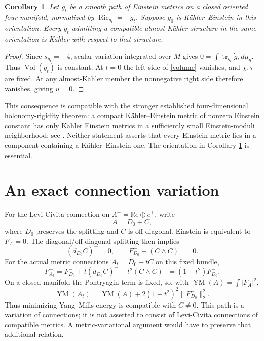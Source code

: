 \documentclass[11pt]{article}
\newtheorem{corollary}[proposition]{Corollary}
\newcommand{\Ric}{\operatorname{Ric}}
\newcommand{\tr}{\operatorname{tr}}
\newcommand{\YM}{\operatorname{YM}}
\newcommand{\vol}{\,d\mu_g}
\begin{document}
\begin{corollary}\label{path}
Let $g_t$ be a smooth path of Einstein metrics on a closed oriented four-manifold, normalized by $\Ric_{g_t}=-g_t$. Suppose $g_0$ is K\"ahler--Einstein in this orientation. Every $g_t$ admitting a compatible almost-K\"ahler structure in the same orientation is K\"ahler with respect to that structure.
\end{corollary}
\begin{proof}
Since $s_{g_t}=-4$, scalar variation integrated over $M$ gives
$0=\int\tr_{g_t}\dot g_t\vol$. Thus $\operatorname{Vol}(g_t)$ is constant. At $t=0$ the left side of \eqref{volume} vanishes, and $\chi,\tau$ are fixed. At any almost-K\"ahler member the nonnegative right side therefore vanishes, giving $u=0$.
\end{proof}
This consequence is compatible with the stronger established four-dimensional holonomy-rigidity theorem: a compact K\"ahler--Einstein metric of nonzero Einstein constant has only K\"ahler Einstein metrics in a sufficiently small Einstein-moduli neighborhood; see \cite[Theorem 6.13]{SS}. Neither statement asserts that every Einstein metric lies in a component containing a K\"ahler--Einstein one. The orientation in Corollary \ref{path} is essential.

\section{An exact connection variation}
For the Levi-Civita connection on $\Lambda^+=\mathbb Re\oplus e^\perp$, write
\[
A=D_0+C,
\]
where $D_0$ preserves the splitting and $C$ is off diagonal. Einstein is equivalent to $F_A^-=0$. The diagonal/off-diagonal splitting then implies
\[
(d_{D_0}C)^-=0,\qquad F_{D_0}^-+(C\wedge C)^-=0.
\]
For the actual metric connections $A_t=D_0+tC$ on this fixed bundle,
\[
F_{A_t}^-=F_{D_0}^-+t(d_{D_0}C)^-+t^2(C\wedge C)^-
=(1-t^2)F_{D_0}^-.
\]
On a closed manifold the Pontryagin term is fixed, so, with $\YM(A)=\int|F_A|^2$,
\begin{equation}\label{ym}
\YM(A_t)=\YM(A)+2(1-t^2)^2\|F_{D_0}^-\|_2^2.
\end{equation}
Thus minimizing Yang--Mills energy is compatible with $C\ne0$. This path is a variation of connections; it is not asserted to consist of Levi-Civita connections of compatible metrics. A metric-variational argument would have to preserve that additional relation.
\end{document}
